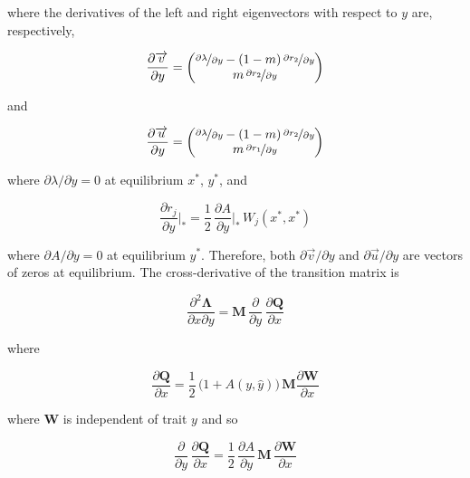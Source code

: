 where the derivatives of the left and right eigenvectors with respect to $y$ are, respectively,

\begin{equation}
    \frac{\partial \overrightarrow{v}}{\partial y} =
    \begin{pmatrix}
        \nicefrac{\partial \lambda}{\partial y} - (1-m)\,\nicefrac{\partial r_2}{\partial y}\\
        m \,\nicefrac{\partial r_2}{\partial y}
    \end{pmatrix}
\end{equation}

and

\begin{equation}
    \frac{\partial \overrightarrow{u}}{\partial y} =
    \begin{pmatrix}
        \nicefrac{\partial \lambda}{\partial y} - (1-m)\,\nicefrac{\partial r_2}{\partial y}\\
        m \,\nicefrac{\partial r_1}{\partial y}
    \end{pmatrix}
\end{equation}

where $\partial \lambda / \partial y = 0$ at equilibrium $x^*$, $y^*$, and

\begin{equation}
    \frac{\partial r_j}{\partial y}\bigg|_* = \frac{1}{2} \, \frac{\partial A}{\partial y}\bigg|_*\,W_j(x^*,x^*)
\end{equation}

where $\partial A / \partial y = 0$ at equilibrium $y^*$. Therefore, both $\partial \overrightarrow{v} / \partial y$ and $\partial \overrightarrow{u} / \partial y$ are vectors of zeros at equilibrium. The cross-derivative of the transition matrix is

\begin{equation}
    \frac{\partial^2 \pmb \Lambda}{\partial x \partial y} = \pmb M \, \frac{\partial}{\partial y}\,\frac{\partial \pmb Q}{\partial x}
\end{equation}

where 

\begin{equation}
    \frac{\partial \pmb Q}{\partial x} = \frac{1}{2}\,\big(1+A(y,\hat y)\big)\,\pmb M \frac{\partial \pmb W}{\partial x}
\end{equation}

where $\pmb W$ is independent of trait $y$ and so

\begin{equation}
    \frac{\partial}{\partial y}\,\frac{\partial \pmb Q}{\partial x} = \frac{1}{2}\,\frac{\partial A}{\partial y}\,\pmb M\,\frac{\partial \pmb W}{\partial x}
\end{equation}

